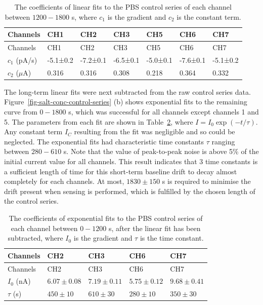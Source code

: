 \documentclass[
  letterpaper,
  DIV=11,
  numbers=noendperiod]{scrartcl}
\begin{document}
\hypertarget{tbl-linear-fits}{}
\begin{longtable}[]{@{}lllllll@{}}
\caption{\label{tbl-linear-fits}The coefficients of linear fits to the
PBS control series of each channel between \(1200-1800\) s, where
\(c_1\) is the gradient and \(c_2\) is the constant term.\\
}\tabularnewline
\toprule\noalign{}
Channels & CH1 & CH2 & CH3 & CH5 & CH6 & CH7 \\
\midrule\noalign{}
\endfirsthead
\toprule\noalign{}
Channels & CH1 & CH2 & CH3 & CH5 & CH6 & CH7 \\
\midrule\noalign{}
\endhead
\bottomrule\noalign{}
\endlastfoot
\(c_1\) (pA/s) & -5.1±0.2 & -7.2±0.1 & -6.5±0.1 & -5.0±0.1 & -7.6±0.1 &
-5.1±0.2 \\
\(c_2\) (\(\mu\)A) & 0.316 & 0.316 & 0.308 & 0.218 & 0.364 & 0.332 \\
\end{longtable}

The long-term linear fits were next subtracted from the raw control
series data. Figure~\ref{fig-salt-conc-control-series} (b) shows
exponential fits to the remaining curve from \(0-1800\) s, which was
successful for all channels except channels 1 and 5. The parameters from
each fit are shown in Table~\ref{tbl-exp-fits}, where
\(I = I_0\exp(-t/\tau)\). Any constant term \(I_C\) resulting from the
fit was negligible and so could be neglected. The exponential fits had
characteristic time constants \(\tau\) ranging between \(280 - 610\) s.
Note that the value of peak-to-peak noise is above 5\% of the initial
current value for all channels. This result indicates that 3 time
constants is a sufficient length of time for this short-term baseline
drift to decay almost completely for each channels. At most,
\(1830\pm150\) s is required to minimise the drift present when sensing
is performed, which is fulfilled by the chosen length of the control
series.

\hypertarget{tbl-exp-fits}{}
\begin{longtable}[]{@{}lllll@{}}
\caption{\label{tbl-exp-fits}The coefficients of exponential fits to the
PBS control series of each channel between \(0-1200\) s, after the
linear fit has been subtracted, where \(I_0\) is the gradient and
\(\tau\) is the time constant.\\
}\tabularnewline
\toprule\noalign{}
Channels & CH2 & CH3 & CH6 & CH7 \\
\midrule\noalign{}
\endfirsthead
\toprule\noalign{}
Channels & CH2 & CH3 & CH6 & CH7 \\
\midrule\noalign{}
\endhead
\bottomrule\noalign{}
\endlastfoot
\(I_0\) (nA) & \(6.07\pm0.08\) & \(7.19\pm0.11\) & \(5.75\pm0.12\) &
\(9.68\pm0.41\) \\
\(\tau\) (s) & \(450\pm10\) & \(610\pm30\) & \(280\pm10\) &
\(350\pm30\) \\
\end{longtable}
\end{document}
